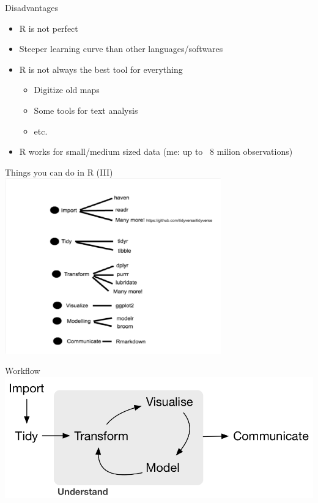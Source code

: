 \documentclass{beamer}
\begin{document}
\begin{frame}{Disadvantages}
\begin{itemize}[<+->]
\item R is not perfect
\item Steeper learning curve than other languages/softwares
\item R is not always the best tool for everything
\begin{itemize}
  \item Digitize old maps
  \item Some tools for text analysis
  \item etc.
  \end{itemize}
  \item R works for small/medium sized data (me: up to ~8 milion observations)
   \end{itemize} 
\end{frame}


 \begin{frame}{Things you can do in R (III)}
  \centering
 \includegraphics[width=0.7\textwidth]{../Figures/tidyverse.png}
 \end{frame}


 \begin{frame}{Workflow}
 \includegraphics[width=1\textwidth]{../Figures/r4ds_data-science.png}
 \end{frame}
\end{document}

